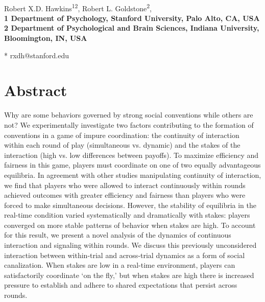 \documentclass[10pt,letterpaper]{article}
\date{}
\begin{document}
\vspace*{0.35in}

\begin{flushleft}
{\Large
\textbf{}
}
\newline
\\
Robert X.D. Hawkins\textsuperscript{12},
Robert L. Goldstone\textsuperscript{2},
\\
\bigskip
\bf{1} Department of Psychology, Stanford University, Palo Alto, CA, USA
\\
\bf{2} Department of Psychological and Brain Sciences, Indiana University, Bloomington, IN, USA
\\
\bigskip

% 
%


* rxdh@stanford.edu

\end{flushleft}
\section*{Abstract}
Why are some behaviors governed by strong social conventions while others are not? We experimentally investigate two factors contributing to the formation of conventions in a game of impure coordination: the continuity of interaction within each round of play (simultaneous vs. dynamic) and the stakes of the interaction (high vs. low differences between payoffs). To maximize efficiency and fairness in this game, players must coordinate on one of two equally advantageous equilibria. In agreement with other studies manipulating continuity of interaction, we find that players who were allowed to interact continuously within rounds achieved outcomes with greater efficiency and fairness than players who were forced to make simultaneous decisions. However, the stability of equilibria in the real-time condition varied systematically and dramatically with stakes: players converged on more stable patterns of behavior when stakes are high. To account for this result, we present a novel analysis of the dynamics of continuous interaction and signaling within rounds. We discuss this previously unconsidered interaction between within-trial and across-trial dynamics as a form of social canalization. When stakes are low in a real-time environment, players can satisfactorily coordinate `on the fly,' but when stakes are high there is increased pressure to establish and adhere to shared expectations that persist across rounds.
\end{document}
